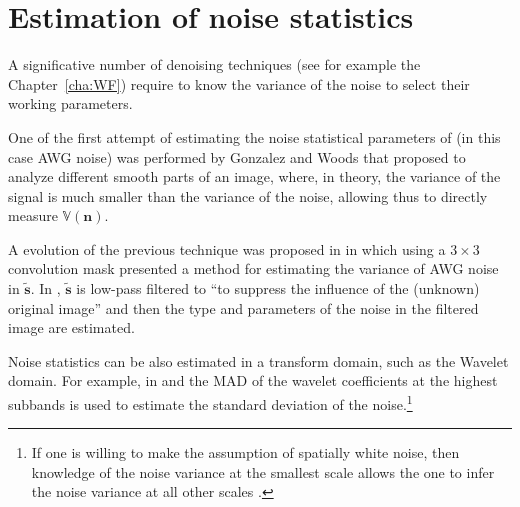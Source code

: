 \section{Estimation of noise statistics}

A significative number of denoising techniques (see for example the
Chapter~\ref{cha:WF}) require to know the variance of the noise to
select their working parameters.

One of the first attempt of estimating the noise statistical
parameters of (in this case \gls{AWG} noise) was performed by Gonzalez
and Woods \cite{gonzalez1992digital} that proposed to analyze
different smooth parts of an image, where, in theory, the variance of
the signal is much smaller than the variance of the noise, allowing
thus to directly measure $\mathbb{V}(\mathbf{n})$.

A evolution of the previous technique was proposed in
\cite{immerkaer1996fast} in which using a $3\times 3$ convolution mask
presented a method for estimating the variance of \gls{AWG} noise in
$\tilde{\mathbf{s}}$. In \cite{rank1999estimation}, $\tilde{\mathbf{s}}$
is low-pass filtered to ``to suppress the influence of the (unknown)
original image'' and then the type and parameters of the noise in the
filtered image are estimated.

Noise statistics can be also estimated in a transform domain, such as
the Wavelet domain. For example, in \cite{donoho1995adapting} and the
\gls{MAD} of the wavelet coefficients at the highest subbands is used
to estimate the standard deviation of the noise.\footnote{If one is
  willing to make the assumption of spatially white noise, then
  knowledge of the noise variance at the smallest scale allows the one
  to infer the noise variance at all other scales
  \cite{de2004training}.}

